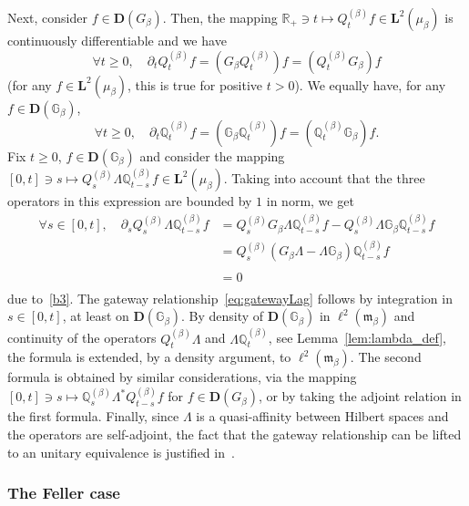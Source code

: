 \documentclass[AHL,Unicode,longabstracts]{cedram}
\newcommand{\RR}{\mathbb{R}}
\newcommand{\fm}{\mathfrak{m}}
\newcommand{\pa}{\partial}
\newcommand{\dBg}{{\discret{G}}}
\newcommand{\Bg}{G}
\newcommand{\dBs}{{\discret{Q}}}
\newcommand{\Bs}{Q}
\newcommand{\esD}{\mathbf{D}}
\newcommand{\esL}{\mathbf{L}}
\newcommand{\esLd}{\ell}
\newcommand{\discret}[1]{\mathds{#1}}
\let\oldforall\forall
\renewcommand*{\forall}{\mathrel{\oldforall}}
\begin{document}
Next, consider $f\in\esD(\Bg_{\beta})$. Then, the mapping $\RR_+\ni t\mapsto \Bs^{(\beta)}_t f \in\esL^2(\mu_{\beta})$ is continuously differentiable and we have
\[
\forall t\geq 0,\quad \pa_t \Bs^{(\beta)}_t f=(\Bg_{\beta}\Bs^{(\beta)}_t)f=(\Bs^{(\beta)}_t\Bg_{\beta}) f
\]
(for any $f\in\esL^2(\mu_{\beta})$, this is true for positive $t>0$). We equally have, for any $f\in \esD(\dBg_{\beta})$,
\[
\forall t\geq 0,\quad \pa_t \dBs^{(\beta)}_t f =(\dBg_{\beta}\dBs^{(\beta)}_t) f=(\dBs^{(\beta)}_t\dBg_{\beta}) f.
\]
Fix $t\geq 0$, $f\in \esD(\dBg_{\beta})$ and consider the mapping $[0,t]\ni s\mapsto \Bs^{(\beta)}_s\Lambda \dBs^{(\beta)}_{t-s}f\in\esL^2(\mu_{\beta})$. Taking into account that the three operators in this expression are bounded by $1$ in norm, we get
\begin{align*}
\forall s\in[0,t],\quad
\pa_s \Bs^{(\beta)}_s\Lambda \dBs^{(\beta)}_{t-s} f&=\Bs^{(\beta)}_s\Bg_{\beta}\Lambda \dBs^{(\beta)}_{t-s} f-\Bs^{(\beta)}_s\Lambda \dBg_{\beta}\dBs^{(\beta)}_{t-s} f \\
&=\Bs^{(\beta)}_s(\Bg_{\beta}\Lambda-\Lambda \dBg_{\beta}) \dBs^{(\beta)}_{t-s}f\\
&=0\phantom{\Bs^{(\beta)}_s}
\end{align*}
due to~\eqref{b3}. The gateway relationship~\eqref{eq:gatewayLag} follows by integration in $s\in[0,t]$, at least on $\esD(\dBg_{\beta})$. By density of $\esD(\dBg_{\beta})$ in $\esLd^2(\fm_{\beta})$ and continuity of the operators $\Bs^{(\beta)}_t\Lambda$ and $\Lambda \dBs^{(\beta)}_t$, see Lemma~\ref{lem:lambda_def}, the formula is extended, by a density argument, to $\esLd^2(\fm_{\beta})$. The second formula is obtained by similar considerations, via the mapping $[0,t]\ni s\mapsto \dBs^{(\beta)}_s\Lambda^* \Bs^{(\beta)}_{t-s}f$ for $f\in\esD(\Bg_{\beta})$, or by taking the adjoint relation in the first formula. Finally, since $\Lambda$ is a quasi-affinity between Hilbert spaces and the operators are self-adjoint, the fact that the gateway relationship can be lifted to an unitary equivalence is justified in~\cite[Lemma~4.1]{Douglas}.

\subsubsection{The Feller case}
\end{document}
